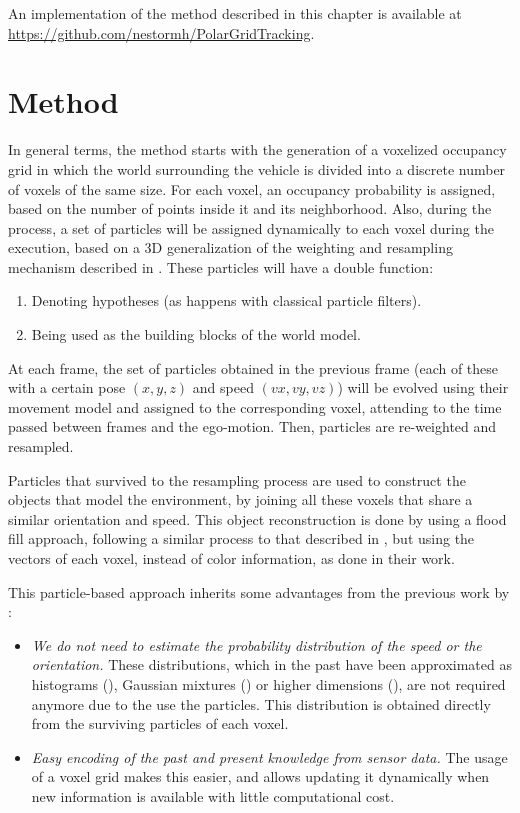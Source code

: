 An implementation of the method described in this chapter is available at \url{https://github.com/nestormh/PolarGridTracking}.

\section{Method}\label{ch:chapter05_01}

In general terms, the method starts with the generation of a voxelized occupancy grid in which the world surrounding the vehicle is divided into a discrete number of voxels of the same size. For each voxel, an occupancy probability is assigned, based on the number of points inside it and its neighborhood. Also, during the process, a set of particles will be assigned dynamically to each voxel during the execution, based on a 3D generalization of the weighting and resampling mechanism described in \cite{isard1998condensation}. These particles will have a double function:
\begin{enumerate}
 \item Denoting hypotheses (as happens with classical particle filters).
 \item Being used as the building blocks of the world model.
\end{enumerate}

At each frame, the set of particles obtained in the previous frame (each of these with a certain pose ${(x, y, z)}$ and speed ${(vx, vy, vz)}$) will be evolved using their movement model and assigned to the corresponding voxel, attending to the time passed between frames and the ego-motion. Then, particles are re-weighted and resampled.

Particles that survived to the resampling process are used to construct the objects that model the environment, by joining all these voxels that share a similar orientation and speed. This object reconstruction is done by using a flood fill approach, following a similar process to that described in \cite{broggi2013}, but using the vectors of each voxel, instead of color information, as done in their work.

This particle-based approach inherits some advantages from the previous work by \cite{danescu2012particle}:
\begin{itemize}
 \item \emph{We do not need to estimate the probability distribution of the speed or the orientation.} These distributions, which in the past have been approximated as histograms (\cite{chen2006dynamic}), Gaussian mixtures (\cite{gindele2009bayesian}) or higher dimensions (\cite{coue2006bayesian}), are not required anymore due to the use the particles. This distribution is obtained directly from the surviving particles of each voxel. 
 \item \emph{Easy encoding of the past and present knowledge from sensor data.} The usage of a voxel grid makes this easier, and allows updating it dynamically when new information is available with little computational cost.
\end{itemize}

